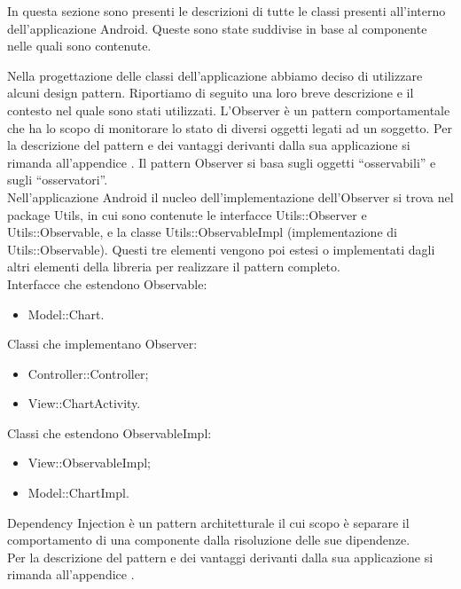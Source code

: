 		In questa sezione sono presenti le descrizioni di tutte le classi presenti all'interno dell'applicazione Android. Queste sono state suddivise in base al componente nelle quali sono contenute.
		
		
		
Nella progettazione delle classi dell'applicazione abbiamo deciso di utilizzare alcuni design pattern. Riportiamo di seguito una loro breve descrizione e il contesto nel quale sono stati utilizzati.
	L'Observer è un pattern comportamentale che ha lo scopo di monitorare lo stato di diversi oggetti legati ad un soggetto.
	Per la descrizione del pattern e dei vantaggi derivanti dalla sua applicazione si rimanda all'appendice .
	Il pattern Observer si basa sugli oggetti “osservabili” e sugli “osservatori”. \\ Nell'applicazione Android il nucleo dell'implementazione dell'Observer si trova nel package Utils, in cui sono contenute le interfacce Utils::Observer e Utils::Observable, e la classe Utils::ObservableImpl (implementazione di Utils::Observable). Questi tre elementi vengono poi estesi o implementati dagli altri elementi della libreria per realizzare il pattern completo.\\
	Interfacce che estendono Observable:
	\begin{itemize}
	\item Model::Chart.
	\end{itemize}
	Classi che implementano Observer:
	\begin{itemize}
	\item Controller::Controller;
	\item View::ChartActivity.
	\end{itemize}
	Classi che estendono ObservableImpl:
	\begin{itemize}
	\item View::ObservableImpl;
	\item Model::ChartImpl.
	\end{itemize}
	Dependency Injection è un pattern architetturale il cui scopo è separare il comportamento di una componente dalla risoluzione delle sue dipendenze.\\
	Per la descrizione del pattern e dei vantaggi derivanti dalla sua applicazione si rimanda all'appendice .
